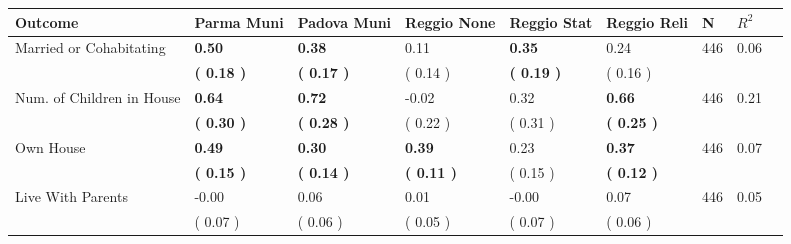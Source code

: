 \begin{tabular}{L{6.2cm} C{1.8cm} C{1.8cm} C{1.8cm} C{1.8cm} C{1.8cm} C{1.8cm} C{0.3cm} C{0.3cm}}
\toprule
 \textbf{Outcome} & \textbf{Parma Muni} & \textbf{Padova Muni} & \textbf{Reggio None} & \textbf{Reggio Stat} & \textbf{Reggio Reli} & \textbf{N} & \textbf{$ R^2$} \\
\midrule
Married or Cohabitating & \textbf{     0.50} & \textbf{     0.38} &      0.11 & \textbf{     0.35} &      0.24  & 446 &       0.06 \\ 
 & \textbf{(     0.18 )} & \textbf{(     0.17 )} & (     0.14 ) & \textbf{(     0.19 )} & (     0.16 )  & \\
Num. of Children in House & \textbf{     0.64} & \textbf{     0.72} &     -0.02 &      0.32 & \textbf{     0.66}  & 446 &       0.21 \\ 
 & \textbf{(     0.30 )} & \textbf{(     0.28 )} & (     0.22 ) & (     0.31 ) & \textbf{(     0.25 )}  & \\
Own House & \textbf{     0.49} & \textbf{     0.30} & \textbf{     0.39} &      0.23 & \textbf{     0.37}  & 446 &       0.07 \\ 
 & \textbf{(     0.15 )} & \textbf{(     0.14 )} & \textbf{(     0.11 )} & (     0.15 ) & \textbf{(     0.12 )}  & \\
Live With Parents &     -0.00 &      0.06 &      0.01 &     -0.00 &      0.07  & 446 &       0.05 \\ 
 & (     0.07 ) & (     0.06 ) & (     0.05 ) & (     0.07 ) & (     0.06 )  & \\
\bottomrule
\end{tabular}
